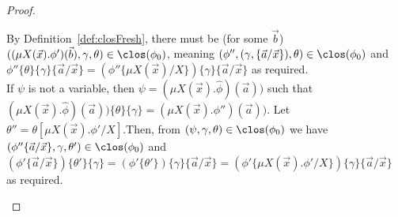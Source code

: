 \begin{proof}
\begin{enumerate}
\begin{itemize}
			By Definition~\ref{def:closFresh}, there must be (for some $\vec b$) $((\mu X(\vec x).\phi')(\vec b),\gamma, \theta) \in \clos(\phi_0)$, meaning $(\phi'',(\gamma, \{\vec a / \vec x\}), \theta) \in \clos(\phi_0)$ and $\phi''\{\theta\}\{\gamma\}\{\vec a / \vec x\} = (\phi''\{\mu X(\vec x) / X\})\{\gamma\}\{\vec a / \vec x\}$ as required.
			\\
			If $\psi$ is not a variable, then $\psi = (\mu X(\vec x).\hat \phi)(\vec a))$ such that $ (\mu X(\vec x).\hat \phi)(\vec a))\{\theta\}\{\gamma\} =  (\mu X(\vec x).\phi'')(\vec a))$. 
			Let $\theta'' = \theta[\mu X(\vec x).\phi' / X]$.Then, from $(\psi,\gamma, \theta) \in \clos(\phi_0)$ we have $(\phi''\{\vec a/ \vec x\}, \gamma,\theta') \in \clos(\phi_0)$ and $(\phi'\{\vec a/ \vec x\})\{\theta'\}\{\gamma\} = (\phi'\{\theta'\})\{\gamma\}\{\vec a/ \vec x\} = (\phi'\{\mu X(\vec x).\phi' / X\})\{\gamma\}\{\vec a / \vec x\}$ as required.
			

\end{itemize}
\end{enumerate}
\end{proof}
